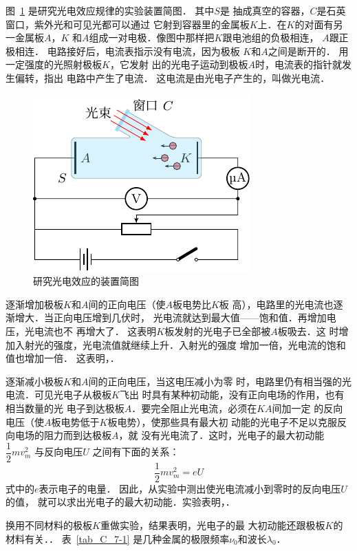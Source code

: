 图~\ref{fig_C_7-2} 是研究光电效应规律的实验装置简图．
其中$S$是
抽成真空的容器，$C$是石英窗口，紫外光和可见光都可以通过
它射到容器里的金属板$K$上．在$K$的对面有另一金属板$A$，$K$
和$A$组成一对电极．像图中那样把$K$跟电池组的负极相连，
$A$跟正极相连．
电路接好后，电流表指示没有电流，因为极板
$K$和$A$之间是断开的．
用一定强度的光照射极板$K$，它发射
出的光电子运动到极板$A$时，电流表的指针就发生偏转，指出
电路中产生了电流．
这电流是由光电子产生的，叫做光电流．
\begin{figure}[htbp]
	\centering
	\includegraphics{fig/C/7-2.pdf}
	\caption{研究光电效应的装置简图}\label{fig_C_7-2}
\end{figure}



逐渐增加极板$K$和$A$间的正向电压（使$A$板电势比$K$板
高），电路里的光电流也逐渐增大．当正向电压增到几伏时，
光电流就达到最大值——饱和值．再增加电压，光电流也不
再增大了．
这表明$K$板发射的光电子已全部被$A$板吸去．这
时增加入射光的强度，光电流值就继续上升．入射光的强度
增加一倍，光电流的饱和值也增加一倍．
这表明，．

逐渐减小极板$K$和$A$间的正向电压，当这电压减小为零
时，电路里仍有相当强的光电流．可见光电子从极板$K$飞出
时具有某种初动能，没有正向电场的作用，也有相当数量的光
电子到达极板$A$．要完全阻止光电流，必须在$KA$间加一定
的反向电压（使$A$板电势低于$K$板电势），使那些具有最大初
动能的光电子不足以克服反向电场的阻力而到达极板$A$，就
没有光电流了．这时，光电子的最大初动能
$\dfrac{1}{2}mv^2_m$
与反向电压$U$
之间有下面的关系：
\[\dfrac{1}{2}mv^2_m=eU \]
式中的$e$表示电子的电量．
因此，从实验中测出使光电流减小到零时的反向电压$U$的值，
就可以求出光电子的最大初动能．实验表明，．

换用不同材料的极板$K$重做实验，结果表明，光电子的最
大初动能还跟极板$K$的材料有关．．
表~\ref{tab_C_7-1} 是几种金属的极限频率$\nu_0$和波长$\lambda_0$．

